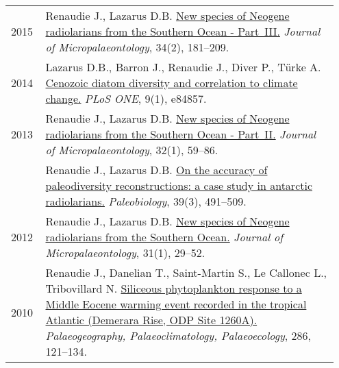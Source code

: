 \documentclass[11pt, a4paper]{article}
\begin{document}
\begin{longtable}{p{0.1\linewidth} P{0.85\linewidth}}
2015 & Renaudie J., Lazarus D.B. \href{http://dx.doi.org/10.1144/jmpaleo2013-034}{New species of Neogene radiolarians from the Southern Ocean - Part III.} \textit{Journal of Micropalaeontology}, 34(2), 181--209.\\
2014 & Lazarus D.B., Barron J., Renaudie J., Diver P., Türke A. \href{http://dx.doi.org/10.1371/journal.pone.0084857}{Cenozoic diatom diversity and correlation to climate change.} \textit{PLoS ONE}, 9(1), e84857.\\
2013 & Renaudie J., Lazarus D.B. \href{http://dx.doi.org/10.1144/jmpaleo2011-025}{New species of Neogene radiolarians from the Southern Ocean - Part II.} \textit{Journal of Micropalaeontology}, 32(1), 59--86.\\
 & Renaudie J., Lazarus D.B. \href{http://dx.doi.org/10.1666/12016}{On the accuracy of paleodiversity reconstructions: a case study in antarctic radiolarians.} \textit{Paleobiology}, 39(3), 491--509.\\
2012 & Renaudie J., Lazarus D.B. \href{http://dx.doi.org/10.1144/0262-821X10-026}{New species of Neogene radiolarians from the Southern Ocean.} \textit{Journal of Micropalaeontology}, 31(1), 29--52.\\
2010 & Renaudie J., Danelian T., Saint-Martin S., Le Callonec L., Tribovillard N. \href{http://dx.doi.org/10.1016/j.palaeo.2009.12.004}{Siliceous phytoplankton response to a Middle Eocene warming event recorded in the tropical Atlantic (Demerara Rise, ODP Site 1260A).} \textit{Palaeogeography, Palaeoclimatology, Palaeoecology}, 286, 121--134.\\
\end{longtable}
\end{document}
